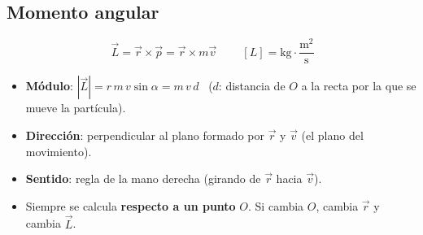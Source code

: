 \documentclass[11pt,a4paper]{article}
\begin{document}
\subsection{Momento angular}\label{sec:L}
\[
\boxed{\ \vec L=\vec r\times\vec p=\vec r\times m\vec v\ }\qquad [L]=\mathrm{kg\cdot\frac{m^2}{s}}
\]
\begin{itemize}[itemsep=2pt]
  \item \textbf{Módulo}: $|\vec L|=r\,m\,v\sin\alpha=m\,v\,d$ \ ($d$: distancia de $O$ a la recta por la que se mueve la partícula).
  \item \textbf{Dirección}: perpendicular al plano formado por $\vec r$ y $\vec v$ (el plano del movimiento).
  \item \textbf{Sentido}: regla de la mano derecha (girando de $\vec r$ hacia $\vec v$).
  \item Siempre se calcula \textbf{respecto a un punto} $O$. Si cambia $O$, cambia $\vec r$ y cambia $\vec L$.
\end{itemize}
\end{document}
